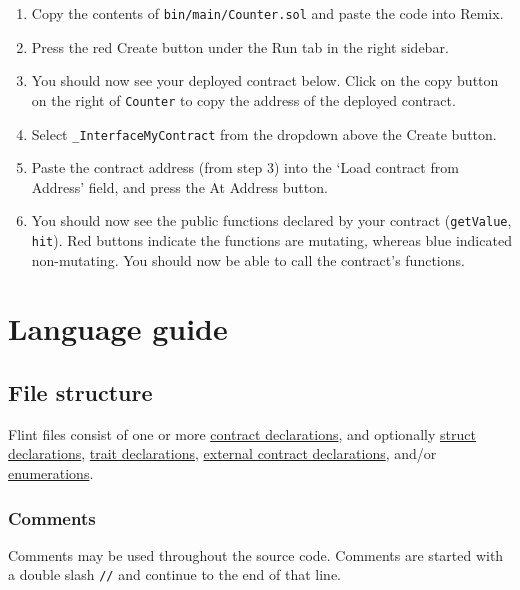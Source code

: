 \begin{enumerate}
	\item Copy the contents of \texttt{bin/main/Counter.sol} and paste the code into Remix.
	\item Press the red Create button under the Run tab in the right sidebar.
	\item You should now see your deployed contract below. Click on the copy button on the right of \texttt{Counter} to copy the address of the deployed contract.
	\item Select \texttt{_InterfaceMyContract} from the dropdown above the Create button.
	\item Paste the contract address (from step 3) into the `Load contract from Address' field, and press the At Address button.
	\item You should now see the public functions declared by your contract (\texttt{getValue}, \texttt{hit}). Red buttons indicate the functions are mutating, whereas blue indicated non-mutating. You should now be able to call the contract's functions.
\end{enumerate}

\section{Language guide}
\label{sec:appendix-b-language-guide-1}

\subsection{File structure}
\label{sec:appendix-b-file-structure}

Flint files consist of one or more \hyperref[sec:appendix-b-contracts]{contract declarations}, and optionally \hyperref[sec:appendix-b-structs]{struct declarations}, \hyperref[sec:appendix-b-traits]{trait declarations}, \hyperref[sec:appendix-b-external-calls]{external contract declarations}, and/or \hyperref[sec:appendix-b-enumerations]{enumerations}.

\subsubsection{Comments}
\label{sec:appendix-b-comments}

Comments may be used throughout the source code. Comments are started with a double slash \texttt{//} and continue to the end of that line.

